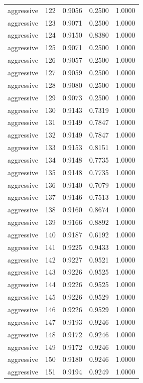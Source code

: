 \begin{tabular}{lrrrr}
aggressive & 122 & 0.9056 & 0.2500 & 1.0000 \\
aggressive & 123 & 0.9071 & 0.2500 & 1.0000 \\
aggressive & 124 & 0.9150 & 0.8380 & 1.0000 \\
aggressive & 125 & 0.9071 & 0.2500 & 1.0000 \\
aggressive & 126 & 0.9057 & 0.2500 & 1.0000 \\
aggressive & 127 & 0.9059 & 0.2500 & 1.0000 \\
aggressive & 128 & 0.9080 & 0.2500 & 1.0000 \\
aggressive & 129 & 0.9073 & 0.2500 & 1.0000 \\
aggressive & 130 & 0.9143 & 0.7319 & 1.0000 \\
aggressive & 131 & 0.9149 & 0.7847 & 1.0000 \\
aggressive & 132 & 0.9149 & 0.7847 & 1.0000 \\
aggressive & 133 & 0.9153 & 0.8151 & 1.0000 \\
aggressive & 134 & 0.9148 & 0.7735 & 1.0000 \\
aggressive & 135 & 0.9148 & 0.7735 & 1.0000 \\
aggressive & 136 & 0.9140 & 0.7079 & 1.0000 \\
aggressive & 137 & 0.9146 & 0.7513 & 1.0000 \\
aggressive & 138 & 0.9160 & 0.8674 & 1.0000 \\
aggressive & 139 & 0.9166 & 0.8892 & 1.0000 \\
aggressive & 140 & 0.9187 & 0.6192 & 1.0000 \\
aggressive & 141 & 0.9225 & 0.9433 & 1.0000 \\
aggressive & 142 & 0.9227 & 0.9521 & 1.0000 \\
aggressive & 143 & 0.9226 & 0.9525 & 1.0000 \\
aggressive & 144 & 0.9226 & 0.9525 & 1.0000 \\
aggressive & 145 & 0.9226 & 0.9529 & 1.0000 \\
aggressive & 146 & 0.9226 & 0.9529 & 1.0000 \\
aggressive & 147 & 0.9193 & 0.9246 & 1.0000 \\
aggressive & 148 & 0.9172 & 0.9246 & 1.0000 \\
aggressive & 149 & 0.9172 & 0.9246 & 1.0000 \\
aggressive & 150 & 0.9180 & 0.9246 & 1.0000 \\
aggressive & 151 & 0.9194 & 0.9249 & 1.0000 \\

\end{tabular}
